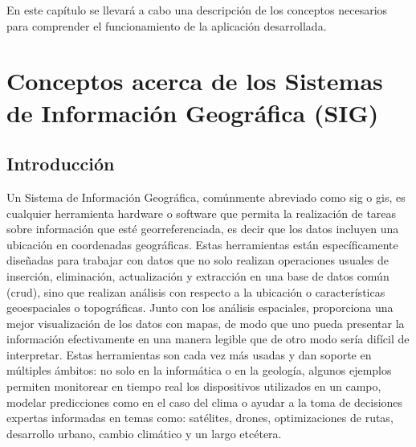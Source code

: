 
En este capítulo se llevará a cabo una descripción de los conceptos necesarios para comprender el funcionamiento de la aplicación desarrollada.

\section{Conceptos acerca de los Sistemas de Información Geográfica (SIG)}
	\subsection{Introducción}
	Un Sistema de Información Geográfica, comúnmente abreviado como \acrshort{sig} o \acrshort{gis}, es cualquier herramienta hardware o software que permita la realización de tareas sobre información que esté georreferenciada, es decir que los datos incluyen una ubicación en coordenadas geográficas. 
	Estas herramientas están específicamente diseñadas para trabajar con datos que no solo realizan operaciones usuales de inserción, eliminación, actualización y extracción en una base de datos común (\acrshort{crud}), sino que realizan análisis con respecto a la ubicación o características geoespaciales o topográficas. Junto con los análisis espaciales, proporciona una mejor visualización de los datos con mapas, de modo que uno pueda presentar la información efectivamente en una manera legible que de otro modo sería difícil de interpretar. 
	Estas herramientas son cada vez más usadas y dan soporte en múltiples ámbitos: no solo en la informática o en la geología, algunos ejemplos permiten monitorear en tiempo real los dispositivos utilizados en un campo, modelar predicciones como en el caso del clima o ayudar a la toma de decisiones expertas informadas en temas como: satélites, drones, optimizaciones de rutas, desarrollo urbano, cambio climático y un largo etcétera.
	
